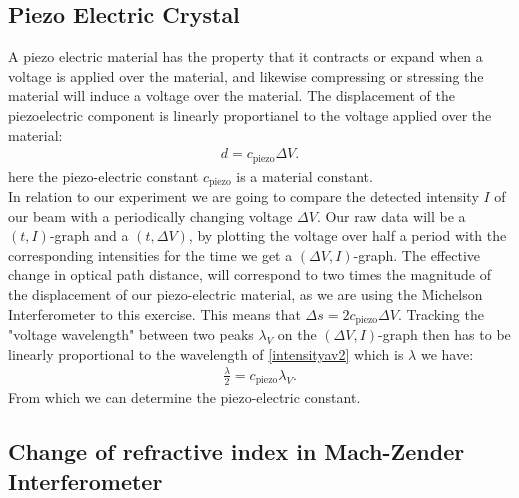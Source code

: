 \subsection{Piezo Electric Crystal}
A piezo electric material has the property that it contracts or expand when a voltage is applied over the material, and likewise compressing or stressing the material will induce a voltage over the material. The displacement of the piezoelectric component is linearly proportianel to the voltage applied over the material:
%
\begin{align}
    d = c_{\text{piezo}}\Delta V.
\label{piezodisp}
\end{align}
%
here the piezo-electric constant $c_{\text{piezo}}$ is a material constant.\\
%
In relation to our experiment we are going to compare the detected intensity $I$ of our beam with a periodically changing voltage $\Delta V$. Our raw data will be a $(t,I)$-graph and a $(t, \Delta V)$, by plotting the voltage over half a period with the corresponding intensities for the time we get a $(\Delta V,I)$-graph. The effective change in optical path distance, will correspond to two times the magnitude of the displacement of our piezo-electric material, as we are using the Michelson Interferometer to this exercise. This means that $\Delta s = 2 c_{\text{piezo}} \Delta V$. Tracking the "voltage wavelength" between two peaks $\lambda_V$ on the $(\Delta V,I)$-graph then has to be linearly proportional to the wavelength of \cref{intensityav2} which is $\lambda$ we have:
%
\begin{align}
    \frac{\lambda}{2} = c_{\text{piezo}}\lambda_V.
\label{piezo}
\end{align}
%
From which we can determine the piezo-electric constant. 

\subsection{Change of refractive index in Mach-Zender Interferometer}

